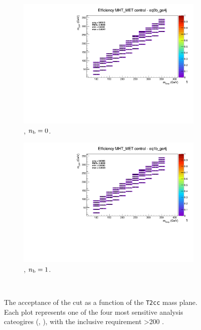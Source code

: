 \begin{figure}[h!]
\begin{subfigure}[b]{0.4\textwidth}
    \includegraphics[width=\textwidth, page=5]{Figs/sms/t2cc/v37/systs/T2cc_MHT_MET_eq0b_ge4j.pdf}
    \caption{\njhigh, $n_{\text{b}} = 0$.}
  \end{subfigure}
  \begin{subfigure}[b]{0.4\textwidth}
    \includegraphics[width=\textwidth, page=5]{Figs/sms/t2cc/v37/systs/T2cc_MHT_MET_eq1b_ge4j.pdf}
    \caption{\njhigh, $n_{\text{b}} = 1$.}
  \end{subfigure}\\
  \caption{The acceptance of the \mhtmet cut as a function of the \texttt{T2cc}
  mass plane. Each plot represents one of the four most sensitive 
  analysis cateogires (\nb, \nj), with the inclusive requirement \HT>200 \gev.}
  \label{fig:sms-mhtmet-t2cc}
\end{figure}


